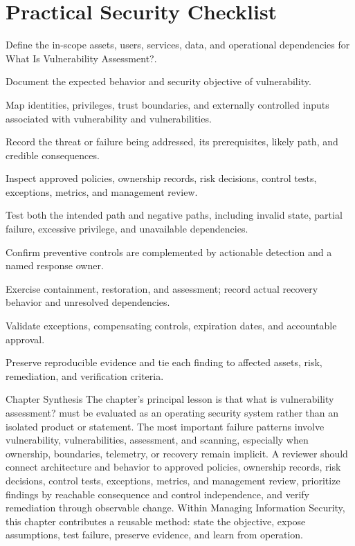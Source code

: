 \documentclass[11pt,letterpaper]{article}
\begin{document}
\section*{Practical Security Checklist}
\begin{CornellChecklist}
\item Define the in-scope assets, users, services, data, and operational dependencies for What Is Vulnerability Assessment?.
\item Document the expected behavior and security objective of vulnerability.
\item Map identities, privileges, trust boundaries, and externally controlled inputs associated with vulnerability and vulnerabilities.
\item Record the threat or failure being addressed, its prerequisites, likely path, and credible consequences.
\item Inspect approved policies, ownership records, risk decisions, control tests, exceptions, metrics, and management review.
\item Test both the intended path and negative paths, including invalid state, partial failure, excessive privilege, and unavailable dependencies.
\item Confirm preventive controls are complemented by actionable detection and a named response owner.
\item Exercise containment, restoration, and assessment; record actual recovery behavior and unresolved dependencies.
\item Validate exceptions, compensating controls, expiration dates, and accountable approval.
\item Preserve reproducible evidence and tie each finding to affected assets, risk, remediation, and verification criteria.
\end{CornellChecklist}
\begin{CornellSummaryBox}{Chapter Synthesis}
The chapter's principal lesson is that what is vulnerability assessment? must be evaluated as an operating security system rather than an isolated product or statement. The most important failure patterns involve vulnerability, vulnerabilities, assessment, and scanning, especially when ownership, boundaries, telemetry, or recovery remain implicit. A reviewer should connect architecture and behavior to approved policies, ownership records, risk decisions, control tests, exceptions, metrics, and management review, prioritize findings by reachable consequence and control independence, and verify remediation through observable change. Within Managing Information Security, this chapter contributes a reusable method: state the objective, expose assumptions, test failure, preserve evidence, and learn from operation.
\end{CornellSummaryBox}
\end{document}
